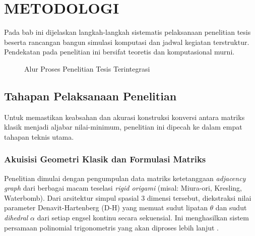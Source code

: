 \chapter{METODOLOGI}


Pada bab ini dijelaskan langkah-langkah sistematis pelaksanaan penelitian tesis beserta rancangan bangun simulasi komputasi dan jadwal kegiatan terstruktur. Pendekatan pada penelitian ini bersifat teoretis dan komputasional murni.

\begin{figure}[H]
  \centering
  \caption{Alur Proses Penelitian Tesis Terintegrasi}
  \label{fig:metodologi}
\end{figure}

\section{Tahapan Pelaksanaan Penelitian}
Untuk memastikan keabsahan dan akurasi konstruksi konversi antara matriks klasik menjadi aljabar nilai-minimum, penelitian ini dipecah ke dalam empat tahapan teknis utama.

\subsection{Akuisisi Geometri Klasik dan Formulasi Matriks}
Penelitian dimulai dengan pengumpulan data matriks ketetanggaan \textit{adjacency graph} dari berbagai macam teselasi \textit{rigid origami} (misal: Miura-ori, Kresling, Waterbomb). Dari arsitektur simpul spasial 3 dimensi tersebut, diekstraksi nilai parameter Denavit-Hartenberg (D-H) yang memuat sudut lipatan $\theta$ dan sudut \textit{dihedral} $\alpha$ dari setiap engsel kontinu secara sekuensial. Ini menghasilkan sistem persamaan polinomial trigonometris yang akan diproses lebih lanjut \parencite{hayakawa2023analytical}.

